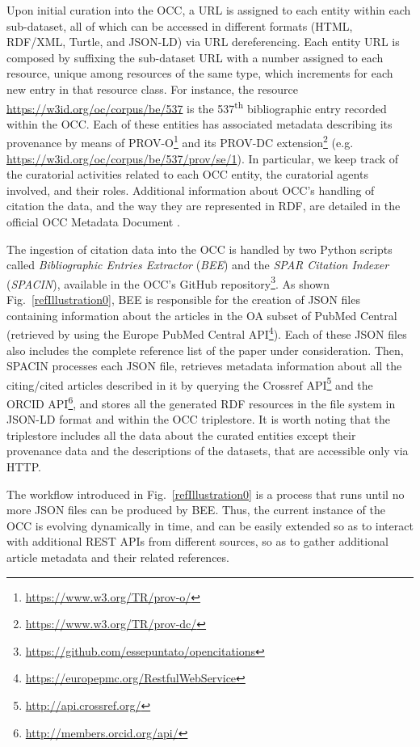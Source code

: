 \documentclass[runningheads,a4paper]{llncs}
\begin{document}
Upon initial curation into the OCC, a URL is assigned to each entity within each sub-dataset, all of which can be accessed in different formats (HTML, RDF/XML, Turtle, and JSON-LD) via URL dereferencing. Each entity URL is composed by suffixing the sub-dataset URL with a number assigned to each resource, unique among resources of the same type, which increments for each new entry in that resource class. For instance, the resource \url{https://w3id.org/oc/corpus/be/537} is the 537\textsuperscript{th} bibliographic entry recorded within the OCC. Each of these entities has associated metadata describing its provenance by means of PROV-O\footnote{\url{https://www.w3.org/TR/prov-o/}} and its PROV-DC extension\footnote{\url{https://www.w3.org/TR/prov-dc/}} (e.g. \url{https://w3id.org/oc/corpus/be/537/prov/se/1}). In particular, we keep track of the curatorial activities related to each OCC entity, the curatorial agents involved, and their roles. Additional information about OCC's handling of citation the data, and the way they are represented in RDF, are detailed in the official OCC Metadata Document  \cite{__RefNumPara__19_1852566440}.

The ingestion of citation data into the OCC is handled by two Python scripts called {\em Bibliographic Entries Extractor} ({\em BEE}) and the {\em SPAR Citation Indexer} ({\em SPACIN}), available in the OCC's GitHub repository\footnote{\url{https://github.com/essepuntato/opencitations}}. As shown Fig.~\ref{refIllustration0}, BEE is responsible for the creation of JSON files containing information about the articles in the OA subset of PubMed Central (retrieved by using the Europe PubMed Central API\footnote{\url{https://europepmc.org/RestfulWebService}}). Each of these JSON files also includes the complete reference list of the paper under consideration. Then, SPACIN processes each JSON file, retrieves metadata information about all the citing/cited articles described in it by querying the Crossref API\footnote{\url{http://api.crossref.org/}} and the ORCID API\footnote{\url{http://members.orcid.org/api/}}, and stores all the generated RDF resources in the file system in JSON-LD format and within the OCC triplestore. It is worth noting that the triplestore includes all the data about the curated entities except their provenance data and the descriptions of the datasets, that are accessible only via HTTP.

The workflow introduced in Fig.~\ref{refIllustration0} is a process that runs until no more JSON files can be produced by BEE. Thus, the current instance of the OCC is evolving dynamically in time, and can be easily extended so as to interact with additional REST APIs from different sources, so as to gather additional article metadata and their related references.
\end{document}
